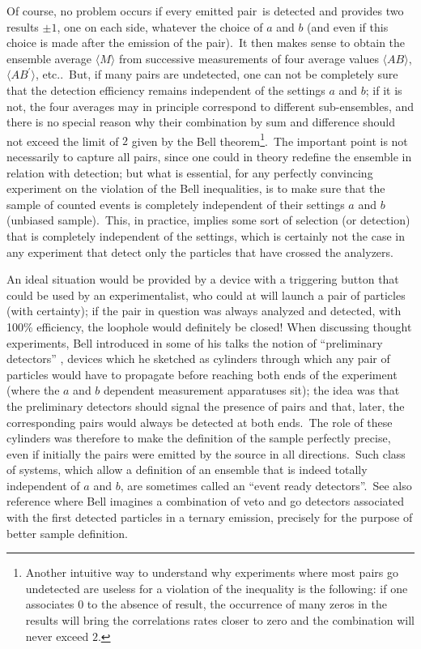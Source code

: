 \documentclass[12pt,onecolumn]{article}%
\begin{document}
Of course, no problem occurs if every emitted pair\ is detected and provides
two results $\pm1$, one on each side, whatever the choice of $a$ and $b$ (and
even if this choice is made after the emission of the pair).\ It then makes
sense to obtain the ensemble average $\langle M\rangle$ from successive measurements of
four average values $\langle AB\rangle$, $\langle AB^{\prime}\rangle$, etc..\ But, if many pairs are
undetected, one can not be completely sure that the detection efficiency
remains independent of the settings $a$ and $b$; if it is not, the four
averages may in principle correspond to different sub-ensembles, and there is
no special reason why their combination by sum and difference should not
exceed the limit of $2$ given by the Bell theorem\footnote{Another intuitive
way to understand why experiments where most pairs go undetected are useless
for a violation of the inequality is the following: if one associates $0$ to
the absence of result, the occurrence of many zeros in the results will bring
the correlations rates closer to zero and the combination will never exceed
$2$.}.\ The important point is not necessarily to capture all pairs, since one
could in theory redefine the ensemble in relation with detection; but what is
essential, for any perfectly convincing experiment on the violation of the
Bell inequalities, is to make sure that the sample of counted events is
completely independent of their settings $a$ and $b$ (unbiased sample).\ This,
in practice, implies some sort of selection (or detection) that is completely
independent of the settings, which is certainly not the case in any experiment
that detect only the particles that have crossed the analyzers.

An ideal situation would be provided by a device with a triggering button that
could be used by an experimentalist, who could at will launch a pair of
particles (with certainty); if the pair in question was always analyzed and
detected, with 100\% efficiency, the loophole would definitely be closed! When
discussing thought experiments, Bell introduced in some of his talks the
notion of ``preliminary detectors'' \cite{Bell-oral}, devices which he
sketched as cylinders through which any pair of particles would have to
propagate before reaching both ends of the experiment (where the $a$ and $b$
dependent measurement apparatuses sit); the idea was that the preliminary
detectors should signal the presence of pairs and that, later, the
corresponding pairs would always be detected at both ends.\ The role of these
cylinders was therefore to make the definition of the sample perfectly
precise, even if initially the pairs were emitted by the source in all
directions.\ Such class of systems, which allow a definition of an ensemble
that is indeed totally independent of $a$ and $b$, are sometimes called an
``event ready detectors''.\ See also reference \cite{Bell-EGAS} where Bell
imagines a combination of veto and go detectors associated with the first
detected particles in a ternary emission, precisely for the purpose of better
sample definition.
\end{document}
